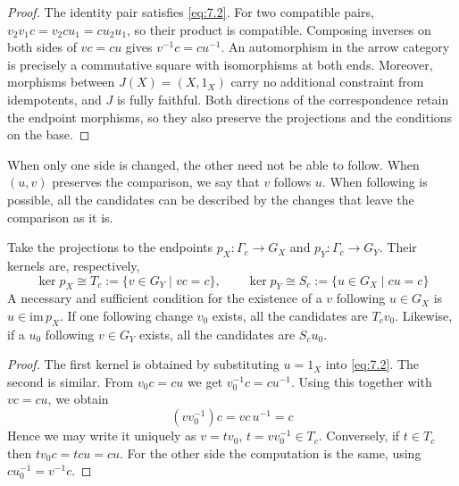\begin{proof}

The identity pair satisfies \eqref{eq:7.2}.
For two compatible pairs, $v_2v_1c=v_2cu_1=cu_2u_1$, so their product is compatible.
Composing inverses on both sides of $vc=cu$ gives $v^{-1}c=cu^{-1}$.
An automorphism in the arrow category is precisely a commutative square with
isomorphisms at both ends. Moreover, morphisms between $J(X)=(X,1_X)$ carry no
additional constraint from idempotents, and $J$ is fully faithful.
Both directions of the correspondence retain the endpoint morphisms, so they also
preserve the projections and the conditions on the base.

\end{proof}

When only one side is changed, the other need not be able to follow.
When $(u,v)$ preserves the comparison, we say that $v$ follows $u$.
When following is possible, all the candidates can be described by the changes that leave
the comparison as it is.

\begin{theorem}\label{thm:7.4}

Take the projections to the endpoints $p_X:\Gamma_c\to G_X$ and
$p_Y:\Gamma_c\to G_Y$.
Their kernels are, respectively,
\begin{equation*}
\ker p_X\cong T_c:=\{v\in G_Y\mid vc=c\},\qquad
\ker p_Y\cong S_c:=\{u\in G_X\mid cu=c\}
\tag{7.4}\label{eq:7.4}
\end{equation*}
A necessary and sufficient condition for the existence of a $v$ following $u\in G_X$ is
$u\in\mathrm{im}\,p_X$.
If one following change $v_0$ exists, all the candidates are $T_cv_0$.
Likewise, if a $u_0$ following $v\in G_Y$ exists, all the candidates are $S_cu_0$.

\end{theorem}

\begin{proof}

The first kernel is obtained by substituting $u=1_X$ into \eqref{eq:7.2}. The second is
similar.
From $v_0c=cu$ we get $v_0^{-1}c=cu^{-1}$. Using this together with $vc=cu$, we obtain
\begin{equation*}
(vv_0^{-1})c=vc\,u^{-1}=c
\tag{7.5}\label{eq:7.5}
\end{equation*}
Hence we may write it uniquely as $v=tv_0$, $t=vv_0^{-1}\in T_c$.
Conversely, if $t\in T_c$ then $tv_0c=tcu=cu$.
For the other side the computation is the same, using $cu_0^{-1}=v^{-1}c$.

\end{proof}

